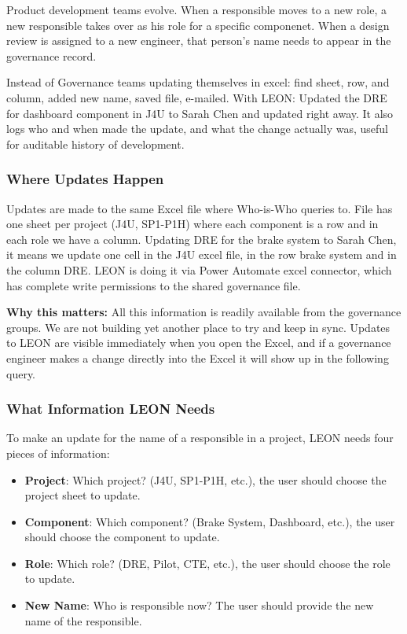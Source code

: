 Product development teams evolve. When a responsible moves to a new role, a new responsible takes over as his role for a specific componenet. When a design review is assigned to a new engineer, that person’s name needs to appear in the governance record.

Instead of Governance teams updating themselves in excel: find sheet, row, and column, added new name, saved file, e-mailed. With LEON: Updated the DRE for dashboard component in J4U to Sarah Chen and updated right away. It also logs who and when made the update, and what the change actually was, useful for auditable history of development.

\subsubsection{\textcolor[HTML]{0066CC}{Where Updates Happen}}

Updates are made to the same Excel file where Who-is-Who queries to. File has one sheet per project (J4U, SP1-P1H) where each component is a row and in each role we have a column. Updating DRE for the brake system to Sarah Chen, it means we update one cell in the J4U excel file, in the row brake system and in the column DRE. LEON is doing it via Power Automate excel connector, which has complete write permissions to the shared governance file.

\textbf{Why this matters:} All this information is readily available from the governance groups. We are not building yet another place to try and keep in sync. Updates to LEON are visible immediately when you open the Excel, and if a governance engineer makes a change directly into the Excel it will show up in the following query.

\subsubsection{\textcolor[HTML]{0066CC}{What Information LEON Needs}}

To make an update for the name of a responsible in a project, LEON needs four pieces of information:

\begin{itemize}
    \item[\quad\textbullet] \textbf{Project}: Which project? (J4U, SP1-P1H, etc.), the user should choose the project sheet to update.
    \item[\quad\textbullet] \textbf{Component}: Which component? (Brake System, Dashboard, etc.), the user should choose the component to update.
    \item[\quad\textbullet] \textbf{Role}: Which role? (DRE, Pilot, CTE, etc.), the user should choose the role to update.
    \item[\quad\textbullet] \textbf{New Name}: Who is responsible now? The user should provide the new name of the responsible.
\end{itemize}

